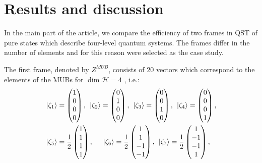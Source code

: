 \documentclass[aps,pra,reprint,groupedaddress,showkeys]{revtex4-1}
\begin{document}
\section{Results and discussion}\label{results}

In the main part of the article, we compare the efficiency of two frames in QST of pure states which describe four-level quantum systems. The frames differ in the number of elements and for this reason were selected as the case study.

The first frame, denoted by $Z^{MUB}$, consists of $20$ vectors which correspond to the elements of the MUBs for $\dim \mathcal{H} =4$ \cite{Klappenecker2004}, i.e.:
\begin{equation}\label{r1}
\begin{split}
&\ket{\zeta_1} = \begin{pmatrix} 1 \\ 0 \\ 0 \\ 0 \end{pmatrix}, \hspace{0.15cm} \ket{\zeta_2} = \begin{pmatrix} 0  \\ 1 \\ 0 \\0 \end{pmatrix}, \hspace{0.15cm} \ket{\zeta_3} = \begin{pmatrix} 0  \\ 0 \\ 1 \\0 \end{pmatrix}, \hspace{0.15cm} \ket{\zeta_4} = \begin{pmatrix} 0  \\ 0 \\ 0 \\1 \end{pmatrix},\\
&\ket{\zeta_5} = \frac{1}{2}\begin{pmatrix} 1 \\ 1 \\ 1 \\ 1 \end{pmatrix}, \hspace{0.5cm} \ket{\zeta_6} = \frac{1}{2}\begin{pmatrix} 1  \\ 1 \\ -1 \\-1 \end{pmatrix}, \hspace{0.15cm} \ket{\zeta_7} = \frac{1}{2}\begin{pmatrix} 1  \\-1 \\ -1 \\1 \end{pmatrix},\\

\end{split}
\end{equation}
\end{document}
